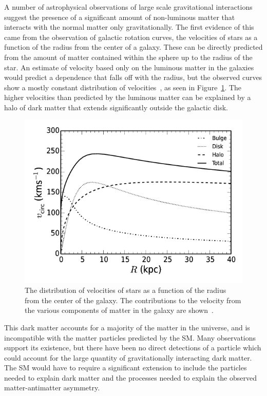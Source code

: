 A number of astrophysical observations of large scale gravitational interactions suggest the presence of a significant amount of non-luminous matter that interacts with the normal matter only gravitationally.
The first evidence of this came from the observation of galactic rotation curves, the velocities of stars as a function of the radius from the center of a galaxy.
These can be directly predicted from the amount of matter contained within the sphere up to the radius of the star.
An estimate of velocity based only on the luminous matter in the galaxies would predict a dependence that falls off with the radius, but the observed curves show a mostly constant distribution of velocities~\cite{rotation_curves}, as seen in Figure~\ref{fig:rotational_curve}.
The higher velocities than predicted by the luminous matter can be explained by a halo of dark matter that extends significantly outside the galactic disk.

\begin{figure}
\includegraphics[width=\fullfig]{figures/rotation_curves.png}
\caption{The distribution of velocities of stars as a function of the radius from the center of the galaxy. The contributions to the velocity from the various components of matter in the galaxy are shown~\cite{rotation_curves}.}
\label{fig:rotational_curve}
\end{figure}

This dark matter accounts for a majority of the matter in the universe, and is incompatible with the matter particles predicted by the \ac{SM}.
Many observations support its existence, but there have been no direct detections of a particle which could account for the large quantity of gravitationally interacting dark matter.
The \ac{SM} would have to require a significant extension to include the particles needed to explain dark matter and the processes needed to explain the observed matter-antimatter asymmetry. 
